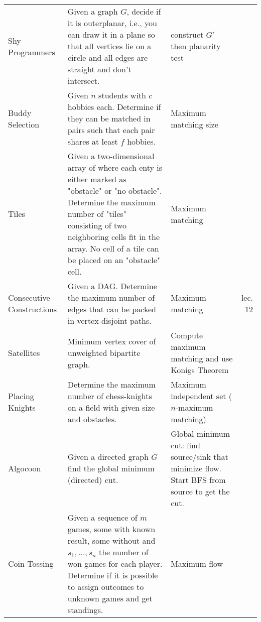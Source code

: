 \documentclass[a4paper, 10pt]{article}
\begin{document}
\begin{longtable}{ L{2cm} L{8cm} L{4cm} r}
        Shy Programmers 
        & Given a graph $G$, decide if it is outerplanar, i.e., you can draw it in a plane so that all vertices lie on a 
            circle and all edges are straight and don't intersect.
        & construct $G'$ then planarity test &  \pageref{sec:shy_programmers} \\

        Buddy Selection
        & Given $n$ students with $c$ hobbies each. Determine if they can be matched in pairs such that each pair shares at least $f$ hobbies.
        & Maximum matching size &  \pageref{sec:buddy_selection} \\

        Tiles 
        & Given a two-dimensional array of where each enty is either marked as "obstacle" or "no obstacle". 
            Determine the maximum number of "tiles" consisting of two neighboring cells fit in the array. 
            No cell of a tile can be placed on an "obstacle" cell. 
            & Maximum matching &  \pageref{sec:tiles} \\

        Consecutive Constructions 
        & Given a DAG. 
        Determine the maximum number of edges that can be packed in vertex-disjoint paths.            
        & Maximum matching &  lec. 12 \\


        Satellites 
        & Minimum vertex cover of unweighted bipartite graph. 
        & Compute maximum matching and use Konigs Theorem &  \pageref{sec:satellites} \\

        Placing Knights 
        & Determine the maximum number of chess-knights on a field with given size and obstacles.
        & Maximum independent set ($n$-maximum matching) &  \pageref{sec:placing_knights} \\

        Algocoon 
        & Given a directed graph $G$ find the global minimum (directed) cut.
        & Global minimum cut: find source/sink that minimize flow. Start BFS from source to get the cut. &  \pageref{sec:algocoon} \\

        Coin Tossing
        & Given a sequence of $m$ games, some with known result, some without and $s_1,\dots,s_n$ the number of won games for each player.
            Determine if it is possible to assign outcomes to unknown games and get standings.
        & Maximum flow &  \pageref{sec:coin_tossing} \\


\end{longtable}
\end{document}
